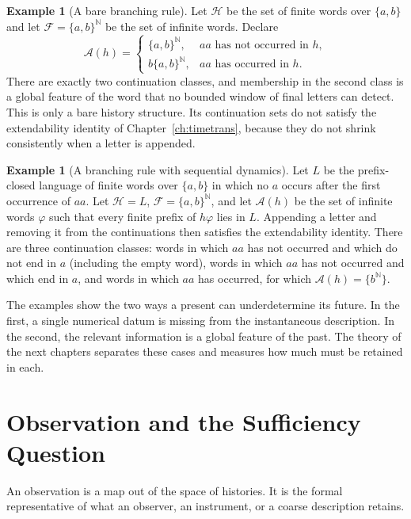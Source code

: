 \documentclass[11pt,oneside]{book}
\theoremstyle{definition}
\newtheorem{example}[theorem]{Example}
\theoremstyle{remark}
\newcommand{\Hist}{\mathcal{H}}
\newcommand{\Fut}{\mathcal{F}}
\newcommand{\Adm}{\mathcal{A}}
\newcommand{\N}{\mathbb{N}}
\begin{document}
\begin{example}[A bare branching rule]\label{ex:bare}
Let $\Hist$ be the set of finite words over $\{a,b\}$ and let $\Fut=\{a,b\}^{\N}$ be the set of infinite words. Declare
\[
\Adm(h)=\begin{cases}
\{a,b\}^{\N}, & aa \text{ has not occurred in } h,\\
b\{a,b\}^{\N}, & aa \text{ has occurred in } h.
\end{cases}
\]
There are exactly two continuation classes, and membership in the second class is a global feature of the word that no bounded window of final letters can detect. This is only a bare history structure. Its continuation sets do not satisfy the extendability identity of Chapter~\ref{ch:timetrans}, because they do not shrink consistently when a letter is appended.
\end{example}

\begin{example}[A branching rule with sequential dynamics]\label{ex:seq}
Let $L$ be the prefix-closed language of finite words over $\{a,b\}$ in which no $a$ occurs after the first occurrence of $aa$. Let $\Hist=L$, $\Fut=\{a,b\}^{\N}$, and let $\Adm(h)$ be the set of infinite words $\varphi$ such that every finite prefix of $h\varphi$ lies in $L$. Appending a letter and removing it from the continuations then satisfies the extendability identity. There are three continuation classes: words in which $aa$ has not occurred and which do not end in $a$ (including the empty word), words in which $aa$ has not occurred and which end in $a$, and words in which $aa$ has occurred, for which $\Adm(h)=\{b^{\N}\}$.
\end{example}

The examples show the two ways a present can underdetermine its future. In the first, a single numerical datum is missing from the instantaneous description. In the second, the relevant information is a global feature of the past. The theory of the next chapters separates these cases and measures how much must be retained in each.

\chapter{Observation and the Sufficiency Question}\label{ch:obs-suff}

An observation is a map out of the space of histories. It is the formal representative of what an observer, an instrument, or a coarse description retains.
\end{document}
